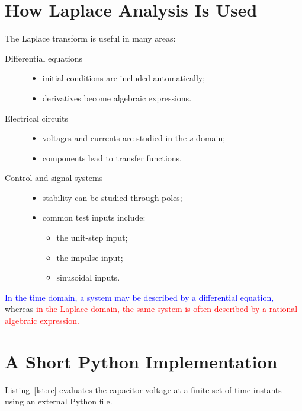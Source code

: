 \documentclass[11pt]{article}
\begin{document}
\section{How Laplace Analysis Is Used}
The Laplace transform is useful in many areas:
\begin{description}
    \item[Differential equations]
        \begin{itemize}[label=$\oplus$, nosep, leftmargin=2em]
            \item initial conditions are included automatically;
            \item derivatives become algebraic expressions.
        \end{itemize}
    \item[Electrical circuits]
        \begin{itemize}[label=$\oplus$, nosep, leftmargin=2em]
            \item voltages and currents are studied in the $s$-domain;
            \item components lead to transfer functions.
        \end{itemize}
    \item[Control and signal systems]
        \begin{itemize}[label=$\oplus$, nosep, leftmargin=2em]
            \item stability can be studied through poles;
            \item common test inputs include:
                \begin{itemize}[label=$\triangleright$, nosep, leftmargin=2em]
                    \item the unit-step input;
                    \item the impulse input;
                    \item sinusoidal inputs.
                \end{itemize}
        \end{itemize}
\end{description}

\textcolor{blue}{In the time domain, a system may be described by a differential
equation,} whereas \textcolor{red}{in the Laplace domain, the same system is often
described by a rational algebraic expression.}

\section{A Short Python Implementation}
Listing~\ref{lst:rc} evaluates the capacitor voltage at a finite set of time
instants using an external Python file.
\end{document}
